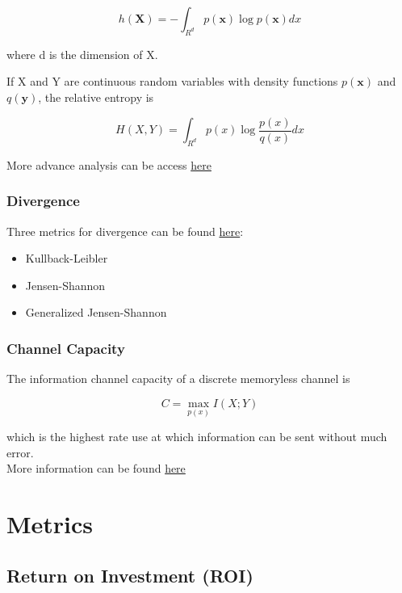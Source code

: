 \documentclass[
]{book}
\providecommand{\tightlist}{%
  \setlength{\itemsep}{0pt}\setlength{\parskip}{0pt}}
\begin{document}
\[
h(\mathbf{X}) = - \int_{R^d} p(\mathbf{x})\log p(\mathbf{x}) dx
\]

where d is the dimension of X.

If X and Y are continuous random variables with density functions \(p(\mathbf{x})\) and \(q(\mathbf{y})\), the relative
entropy is

\[
H(X,Y) = \int_{R^d} p(x) \log \frac{p(x)}{q(x)} dx
\]

More advance analysis can be access \href{https://elife-asu.github.io/rinform/\#4_time_series_measures}{here}

\hypertarget{divergence}{%
\subsection{Divergence}\label{divergence}}

Three metrics for divergence can be found
\href{https://cran.r-project.org/web/packages/philentropy/vignettes/Information_Theory.html}{here}:

\begin{itemize}
\tightlist
\item
  Kullback-Leibler
\item
  Jensen-Shannon
\item
  Generalized Jensen-Shannon
\end{itemize}

\hypertarget{channel-capacity}{%
\subsection{Channel Capacity}\label{channel-capacity}}

The information channel capacity of a discrete memoryless channel is

\[
C = \max_{p(x)} I(X;Y)
\]

which is the highest rate use at which information can be sent without much error.\\
More information can be found \href{http://www.di.fc.ul.pt/~jpn/r/inf_theory/informationtheory.html}{here}

\hypertarget{metrics}{%
\chapter{Metrics}\label{metrics}}

\hypertarget{return-on-investment-roi}{%
\section{Return on Investment (ROI)}\label{return-on-investment-roi}}
\end{document}
